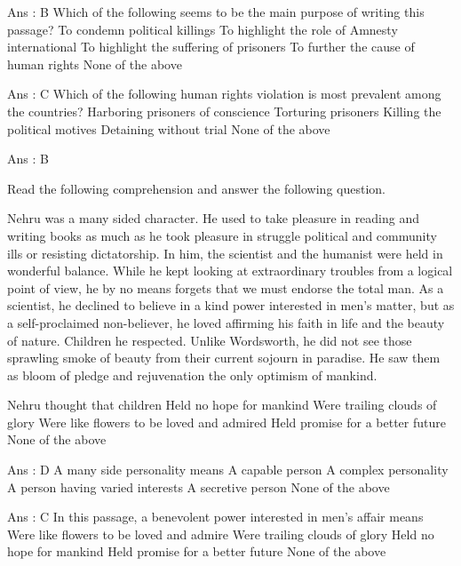         Ans : B
        Which of the following seems to be the main purpose of writing this passage?
            To condemn political killings
            To highlight the role of Amnesty international
            To highlight the suffering of prisoners
            To further the cause of human rights
            None of the above 

        Ans : C
        Which of the following human rights violation is most prevalent among the countries?
            Harboring prisoners of conscience
            Torturing prisoners
            Killing the political motives
            Detaining without trial
            None of the above 

        Ans : B 




Read the following comprehension and answer the following question.

    Nehru was a many sided character. He used to take pleasure in reading and writing books as much as he took pleasure in struggle political and community ills or resisting dictatorship. In him, the scientist and the humanist were held in wonderful balance. While he kept looking at extraordinary troubles from a logical point of view, he by no means forgets that we must endorse the total man. As a scientist, he declined to believe in a kind power interested in men’s matter, but as a self-proclaimed non-believer, he loved affirming his faith in life and the beauty of nature. Children he respected. Unlike Wordsworth, he did not see those sprawling smoke of beauty from their current sojourn in paradise. He saw them as bloom of pledge and rejuvenation the only optimism of mankind.



        Nehru thought that children
            Held no hope for mankind
            Were trailing clouds of glory
            Were like flowers to be loved and admired
            Held promise for a better future
            None of the above 

        Ans : D
        A many side personality means
            A capable person
            A complex personality
            A person having varied interests
            A secretive person
            None of the above 

        Ans : C
        In this passage, a benevolent power interested in men’s affair means
            Were like flowers to be loved and admire
            Were trailing clouds of glory
            Held no hope for mankind
            Held promise for a better future
            None of the above 

